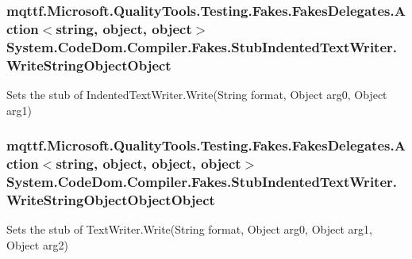\hypertarget{class_system_1_1_code_dom_1_1_compiler_1_1_fakes_1_1_stub_indented_text_writer_acc890f5d32b9cc4d86c125187dced2a3}{
\subsubsection[{Write\-String\-Object\-Object}]{\setlength{\rightskip}{0pt plus 5cm}mqttf.\-Microsoft.\-Quality\-Tools.\-Testing.\-Fakes.\-Fakes\-Delegates.\-Action$<$string, object, object$>$ System.\-Code\-Dom.\-Compiler.\-Fakes.\-Stub\-Indented\-Text\-Writer.\-Write\-String\-Object\-Object}}\label{class_system_1_1_code_dom_1_1_compiler_1_1_fakes_1_1_stub_indented_text_writer_acc890f5d32b9cc4d86c125187dced2a3}


Sets the stub of Indented\-Text\-Writer.\-Write(\-String format, Object arg0, Object arg1)

\hypertarget{class_system_1_1_code_dom_1_1_compiler_1_1_fakes_1_1_stub_indented_text_writer_aab3a09e837afb84d569bfd278273be85}{
\subsubsection[{Write\-String\-Object\-Object\-Object}]{\setlength{\rightskip}{0pt plus 5cm}mqttf.\-Microsoft.\-Quality\-Tools.\-Testing.\-Fakes.\-Fakes\-Delegates.\-Action$<$string, object, object, object$>$ System.\-Code\-Dom.\-Compiler.\-Fakes.\-Stub\-Indented\-Text\-Writer.\-Write\-String\-Object\-Object\-Object}}\label{class_system_1_1_code_dom_1_1_compiler_1_1_fakes_1_1_stub_indented_text_writer_aab3a09e837afb84d569bfd278273be85}


Sets the stub of Text\-Writer.\-Write(\-String format, Object arg0, Object arg1, Object arg2)

